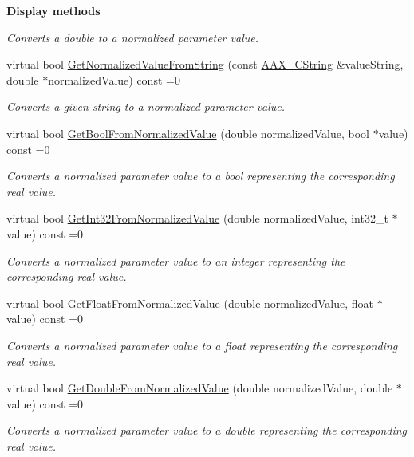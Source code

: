 \begin{Indent}{\bf Display methods}
\begin{DoxyCompactItemize}
\begin{DoxyCompactList}\small\item\em Converts a double to a normalized parameter value. \end{DoxyCompactList}\item 
virtual bool \hyperlink{a00108_ae4c1aa17e39fab796182f5b485920c29}{Get\+Normalized\+Value\+From\+String} (const \hyperlink{a00042}{A\+A\+X\+\_\+\+C\+String} \&value\+String, double $\ast$normalized\+Value) const =0
\begin{DoxyCompactList}\small\item\em Converts a given string to a normalized parameter value. \end{DoxyCompactList}\item 
virtual bool \hyperlink{a00108_a5be2681a41d588b693ec72a8c665a192}{Get\+Bool\+From\+Normalized\+Value} (double normalized\+Value, bool $\ast$value) const =0
\begin{DoxyCompactList}\small\item\em Converts a normalized parameter value to a bool representing the corresponding real value. \end{DoxyCompactList}\item 
virtual bool \hyperlink{a00108_a1928f0122ac787fe7019b56ea4aed81b}{Get\+Int32\+From\+Normalized\+Value} (double normalized\+Value, int32\+\_\+t $\ast$value) const =0
\begin{DoxyCompactList}\small\item\em Converts a normalized parameter value to an integer representing the corresponding real value. \end{DoxyCompactList}\item 
virtual bool \hyperlink{a00108_ab3c3706381e681108d03ea14b4989fb1}{Get\+Float\+From\+Normalized\+Value} (double normalized\+Value, float $\ast$value) const =0
\begin{DoxyCompactList}\small\item\em Converts a normalized parameter value to a float representing the corresponding real value. \end{DoxyCompactList}\item 
virtual bool \hyperlink{a00108_abeae0f2df8e8f133c4747152c72c2bcc}{Get\+Double\+From\+Normalized\+Value} (double normalized\+Value, double $\ast$value) const =0
\begin{DoxyCompactList}\small\item\em Converts a normalized parameter value to a double representing the corresponding real value. \end{DoxyCompactList}\item 

\end{DoxyCompactItemize}
\end{Indent}
